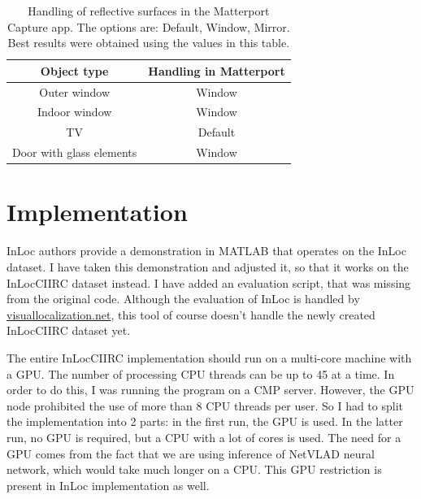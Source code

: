 \documentclass[twoside]{ctuthesis}
\theoremstyle{plain}
\theoremstyle{definition}
\theoremstyle{note}
\begin{document}
\begin{table}[htb!]
	\centering
	\begin{tabular}{|c|c|}
		\hline
		Object type & Handling in Matterport \\
		\hline
		\hline
		Outer window & Window \\
		\hline
		Indoor window & Window \\
		\hline
		TV & Default \\
		\hline
		Door with glass elements & Window \\
		\hline
	\end{tabular}
	\caption{Handling of reflective surfaces in the Matterport Capture app. The options are: Default, Window, Mirror. Best results were obtained using the values in this table.}
	\label{tab:matterport-reflective-surfaces}
\end{table}

\chapter{Implementation}
\label{chapter:implementation}

InLoc \cite{taira2018inloc} authors provide a demonstration in MATLAB that operates on the InLoc dataset. I have taken this demonstration and adjusted it, so that it works on the InLocCIIRC dataset instead. I have added an evaluation script, that was missing from the original code. Although the evaluation of InLoc is handled by \url{visuallocalization.net}, this tool of course doesn't handle the newly created InLocCIIRC dataset yet.

The entire InLocCIIRC implementation should run on a multi-core machine with a GPU. The number of processing CPU threads can be up to 45 at a time. In order to do this, I was running the program on a CMP server. However, the GPU node prohibited the use of more than 8 CPU threads per user. So I had to split the implementation into 2 parts: in the first run, the GPU is used. In the latter run, no GPU is required, but a CPU with a lot of cores is used. The need for a GPU comes from the fact that we are using inference of NetVLAD neural network, which would take much longer on a CPU. This GPU restriction is present in InLoc implementation as well.
\end{document}
